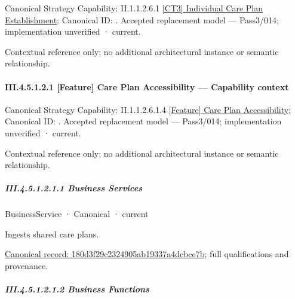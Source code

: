 {\small Canonical Strategy Capability: II.1.1.2.6.1 \hyperref[element:03ea71cc13094c62ab6bbc6f51b1fffc]{[CT3] Individual Care Plan Establishment}; Canonical ID: \texttt{}. Accepted replacement model — Pass3/014; implementation unverified · current.}\par
Contextual reference only; no additional architectural instance or semantic relationship.\par
\paragraph*{III.4.5.1.2.1 [Feature] Care Plan Accessibility — Capability context}
\label{navigation:III.4.5.1.2.1}

{\small Canonical Strategy Capability: II.1.1.2.6.1.4 \hyperref[element:ca741f8bbfd246cc9a39ec117b24fa0c]{[Feature] Care Plan Accessibility}; Canonical ID: \texttt{}. Accepted replacement model — Pass3/014; implementation unverified · current.}\par
Contextual reference only; no additional architectural instance or semantic relationship.\par
\subparagraph*{III.4.5.1.2.1.1 Business Services}
\label{navigation:III.4.5.1.2.1.1}

\label{navigation:III.4.5.1.2.1.1.1}

\label{element:180d3f29c2324905ab19337a4dcbce7b}
{\small BusinessService · Canonical · current}\par

Ingests shared care plans.


{\footnotesize \href{../../../../../../../continuum/business/business-service/180d3f29c2324905ab19337a4dcbce7b.md}{Canonical record: 180d3f29c2324905ab19337a4dcbce7b}; full qualifications and provenance.}\par
\subparagraph*{III.4.5.1.2.1.2 Business Functions}
\label{navigation:III.4.5.1.2.1.2}

\label{navigation:III.4.5.1.2.1.2.1}

